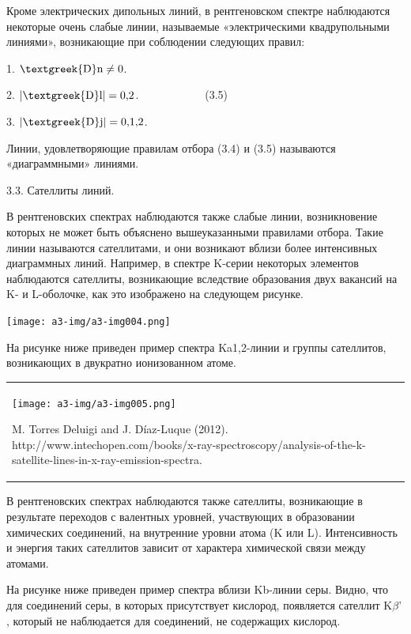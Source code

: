 \documentclass[a4paper,14pt, openany, twoside, draft]{extbook} %
\begin{document}
Кроме электрических дипольных линий, в рентгеновском спектре наблюдаются некоторые очень слабые линии, называемые «электрическими квадрупольными линиями», возникающие при соблюдении следующих правил:

1.   ${\text{\textgreek{D}n}}\neq 0$.\ \ \ \ \ \ \ \ \ \

2.   $|{\text{\textgreek{D}l}}|=\text{0,2}$.\ \ \ \ \ \ \ \ \ \ \ \ (3.5)

3.   $|{\text{\textgreek{D}j}}|=\text{0,1,2}$.\ \ \ \ \ \ \ \

Линии, удовлетворяющие правилам отбора (3.4) и (3.5) называются «диаграммными» линиями.

3.3. Сателлиты линий.

В рентгеновских спектрах наблюдаются также слабые линии, возникновение которых не может быть объяснено вышеуказанными правилами отбора. Такие линии называются сателлитами, и они возникают вблизи более интенсивных диаграммных линий. Например, в спектре K{}-серии некоторых элементов наблюдаются сателлиты, возникающие вследствие образования двух вакансий на K{}- и L{}-оболочке, как это изображено на следующем рисунке.

 \texttt{[image: a3-img/a3-img004.png]}

На рисунке ниже приведен пример спектра K\textgreek{a}1,2{}-линии и группы сателлитов, возникающих в двукратно ионизованном атоме.

\begin{flushleft}
\tablefirsthead{}
\tablehead{}
\tabletail{}
\tablelasttail{}
\begin{supertabular}{m{17.179998cm}}
{  \texttt{[image: a3-img/a3-img005.png]} }

{ M. Torres Deluigi and J. Díaz-Luque (2012). http://www.intechopen.com/books/x{}-ray{}-spectroscopy/analysis{}-of{}-the{}-k{}-satellite{}-lines{}-in{}-x{}-ray{}-emission{}-spectra.}

\\
\end{supertabular}
\end{flushleft}
В рентгеновских спектрах наблюдаются также сателлиты, возникающие в результате переходов с валентных уровней, участвующих в образовании химических соединений, на внутренние уровни атома (K или L). Интенсивность и энергия таких сателлитов зависит от характера химической связи между атомами.

На рисунке ниже приведен пример спектра вблизи K\textgreek{b}{}-линии серы. Видно, что для соединений серы, в которых присутствует кислород, появляется сателлит K${\beta}$’ , который не наблюдается для соединений, не содержащих кислород.
\end{document}
